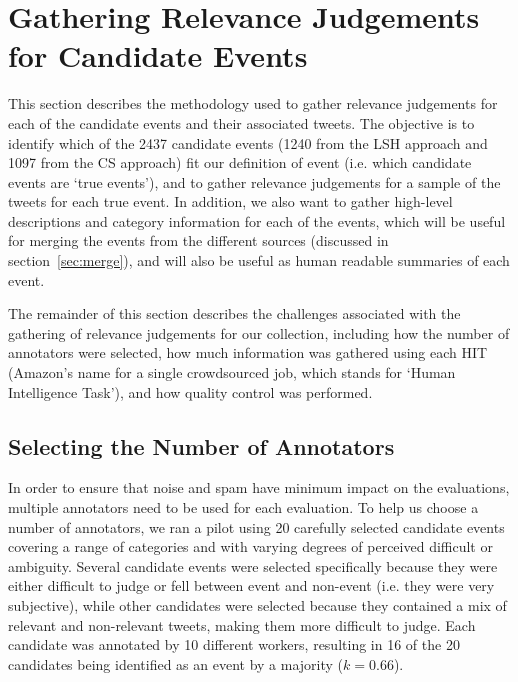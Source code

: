 \section{Gathering Relevance Judgements for Candidate Events}
This section describes the methodology used to gather relevance judgements for each of the candidate events and their associated tweets.
The objective is to identify which of the 2437 candidate events (1240 from the LSH approach and 1097 from the CS approach) fit our definition of event (i.e. which candidate events are `true events'), and to gather relevance judgements for a sample of the tweets for each true event.
In addition, we also want to gather high-level descriptions and category information for each of the events, which will be useful for merging the events from the different sources (discussed in section~\ref{sec:merge}), and will also be useful as human readable summaries of each event.

The remainder of this section describes the challenges associated with the gathering of relevance judgements for our collection, including how the number of annotators were selected, how much information was gathered using each HIT (Amazon's name for a single crowdsourced job, which stands for `Human Intelligence Task'), and how quality control was performed.

\subsection{Selecting the Number of Annotators}
\label{sec:numAnnotators}
In order to ensure that noise and spam have minimum impact on the evaluations, multiple annotators need to be used for each evaluation.
To help us choose a number of annotators, we ran a pilot using 20 carefully selected candidate events covering a range of categories and with varying degrees of perceived difficult or ambiguity.
Several candidate events were selected specifically because they were either difficult to judge or fell between event and non-event (i.e. they were very subjective), while other candidates were selected because they contained a mix of relevant and non-relevant tweets, making them more difficult to judge.
Each candidate was annotated by 10 different workers, resulting in 16 of the 20 candidates being identified as an event by a majority (\(k = 0.66\)).

